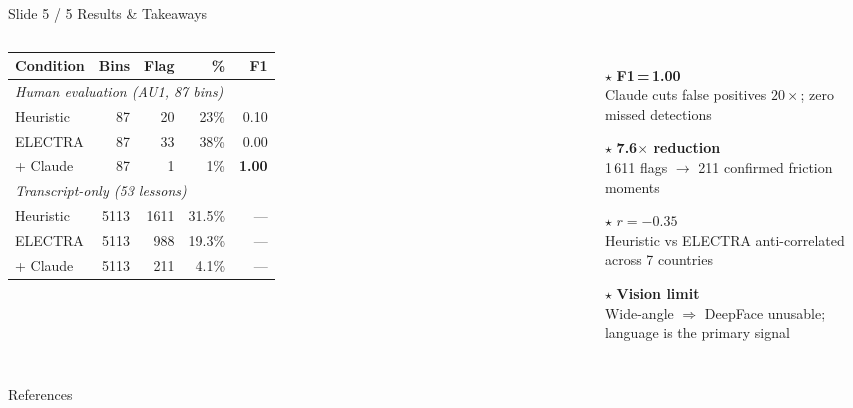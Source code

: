\documentclass[aspectratio=169,10pt]{beamer}
\newcommand{\hl}[1]{\textcolor{myteal}{\textbf{#1}}}
\begin{document}
\begin{frame}{Slide 5 / 5 \quad Results \& Takeaways}
\begin{columns}[T]
{\small
\begin{tabular}{lrrrr}
\toprule
\textbf{Condition} & \textbf{Bins} & \textbf{Flag} & \textbf{\%} & \textbf{F1}\\
\midrule
\multicolumn{5}{l}{\textit{Human evaluation (AU1, 87 bins)}}\\
\quad Heuristic           &  87 &  20 & 23\% & 0.10 \\
\quad ELECTRA             &  87 &  33 & 38\% & 0.00 \\
\rowcolor{myhighlight}
\quad + Claude            &  87 &   1 &  1\% & \textbf{1.00} \\
\midrule
\multicolumn{5}{l}{\textit{Transcript-only (53 lessons)}}\\
\quad Heuristic           & 5113 & 1611 & 31.5\% & --- \\
\quad ELECTRA             & 5113 &  988 & 19.3\% & --- \\
\rowcolor{myhighlight}
\quad + Claude            & 5113 &  211 &  4.1\% & --- \\
\bottomrule
\end{tabular}
}
\begin{itemize}\setlength\itemsep{0.5em}
  \item[\hl{$\star$}] \textbf{F1\,=\,1.00}\\
        Claude cuts false positives $20\times$; zero missed detections
  \item[\hl{$\star$}] \textbf{7.6$\times$ reduction}\\
        1\,611 flags $\to$ 211 confirmed friction moments
  \item[\hl{$\star$}] \textbf{$r{=}{-}0.35$}\\
        Heuristic vs ELECTRA anti-correlated across 7 countries
  \item[\hl{$\star$}] \textbf{Vision limit}\\
        Wide-angle $\Rightarrow$ DeepFace unusable;
        language is the primary signal
\end{itemize}
\end{columns}
\end{frame}

\begin{frame}[allowframebreaks]{References}
{\footnotesize


}
\end{frame}
\end{document}

